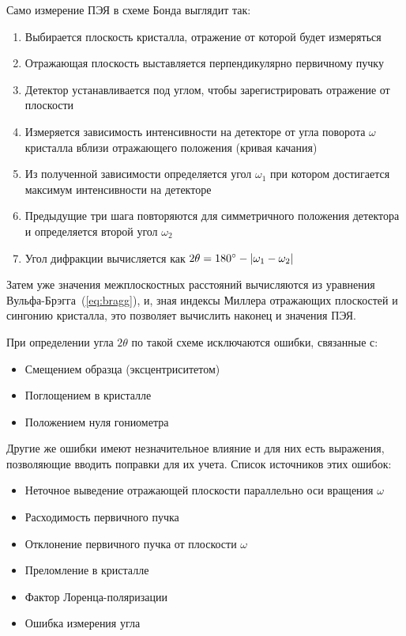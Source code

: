Само измерение ПЭЯ в схеме Бонда выглядит так:
\begin{enumerate}
    \item Выбирается плоскость кристалла, отражение от которой будет измеряться
    \item Отражающая плоскость выставляется перпендикулярно первичному пучку
    \item Детектор устанавливается под углом, чтобы зарегистрировать отражение от плоскости
    \item Измеряется зависимость интенсивности на детекторе от угла поворота $\omega$ кристалла вблизи отражающего положения (кривая качания)
    \item Из полученной зависимости определяется угол $\omega_1$ при котором достигается максимум интенсивности на детекторе
    \item Предыдущие три шага повторяются для симметричного положения детектора и определяется второй угол $\omega_2$
    \item Угол дифракции вычисляется как $2\theta=180^\circ-|\omega_1-\omega_2|$
\end{enumerate}
Затем уже значения межплоскостных расстояний вычисляются из уравнения Вульфа-Брэгга~(\ref{eq:bragg}), и, зная индексы Миллера отражающих плоскостей и сингонию кристалла, это позволяет вычислить наконец и значения ПЭЯ.

При определении угла $2\theta$ по такой схеме исключаются ошибки, связанные с:
\begin{itemize}
    \item Смещением образца (эксцентриситетом)
    \item Поглощением в кристалле
    \item Положением нуля гониометра
\end{itemize}
Другие же ошибки имеют незначительное влияние и для них есть выражения, позволяющие вводить поправки для их учета.
Список источников этих ошибок:
\begin{itemize}
    \item Неточное выведение отражающей плоскости параллельно оси вращения $\omega$
    \item Расходимость первичного пучка
    \item Отклонение первичного пучка от плоскости $\omega$
    \item Преломление в кристалле
    \item Фактор Лоренца-поляризации
    \item Ошибка измерения угла
\end{itemize}


